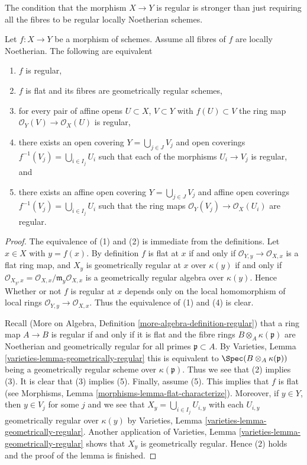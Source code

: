 \noindent
The condition that the morphism $X \to Y$ is regular
is stronger than just requiring all
the fibres to be regular locally Noetherian schemes.

\begin{lemma}
\label{lemma-regular}
Let $f : X \to Y$ be a morphism of schemes.
Assume all fibres of $f$ are locally Noetherian.
The following are equivalent
\begin{enumerate}
\item $f$ is regular,
\item $f$ is flat and its fibres are geometrically regular schemes,
\item for every pair of affine opens $U \subset X$, $V \subset Y$
with $f(U) \subset V$ the ring map $\mathcal{O}_Y(V) \to \mathcal{O}_X(U)$
is regular,
\item there exists an open covering $Y = \bigcup_{j \in J} V_j$
and open coverings $f^{-1}(V_j) = \bigcup_{i \in I_j} U_i$ such
that each of the morphisms $U_i \to V_j$ is regular, and
\item there exists an affine open covering $Y = \bigcup_{j \in J} V_j$
and affine open coverings $f^{-1}(V_j) = \bigcup_{i \in I_j} U_i$ such
that the ring maps $\mathcal{O}_Y(V_j) \to \mathcal{O}_X(U_i)$ are regular.
\end{enumerate}
\end{lemma}

\begin{proof}
The equivalence of (1) and (2) is immediate from the definitions.
Let $x \in X$ with $y = f(x)$. By definition $f$ is flat at $x$
if and only if $\mathcal{O}_{Y, y} \to \mathcal{O}_{X, x}$ is a
flat ring map, and $X_y$ is geometrically regular at $x$ over
$\kappa(y)$ if and only if
$\mathcal{O}_{X_y, x} = \mathcal{O}_{X, x}/\mathfrak m_y\mathcal{O}_{X, x}$
is a geometrically regular algebra over $\kappa(y)$. Hence
Whether or not $f$ is regular at $x$
depends only on the local homomorphism of local rings
$\mathcal{O}_{Y, y} \to \mathcal{O}_{X, x}$.
Thus the equivalence of (1) and (4) is clear.

\medskip\noindent
Recall (More on Algebra, Definition \ref{more-algebra-definition-regular})
that a ring map $A \to B$ is regular if and only if it is flat
and the fibre rings $B \otimes_A \kappa(\mathfrak p)$ are Noetherian
and geometrically regular for all primes $\mathfrak p \subset A$.
By Varieties, Lemma \ref{varieties-lemma-geometrically-regular}
this is equivalent to $\Spec(B \otimes_A \kappa(\mathfrak p))$
being a geometrically regular scheme over $\kappa(\mathfrak p)$.
Thus we see that (2) implies (3). It is clear that (3) implies
(5). Finally, assume (5). This implies that $f$ is flat
(see Morphisms, Lemma \ref{morphisms-lemma-flat-characterize}).
Moreover, if $y \in Y$, then $y \in V_j$ for some $j$ and we see
that $X_y = \bigcup_{i \in I_j} U_{i, y}$ with each $U_{i, y}$
geometrically regular over $\kappa(y)$ by
Varieties, Lemma \ref{varieties-lemma-geometrically-regular}.
Another application of
Varieties, Lemma \ref{varieties-lemma-geometrically-regular}
shows that $X_y$ is geometrically regular. Hence (2) holds
and the proof of the lemma is finished.
\end{proof}

